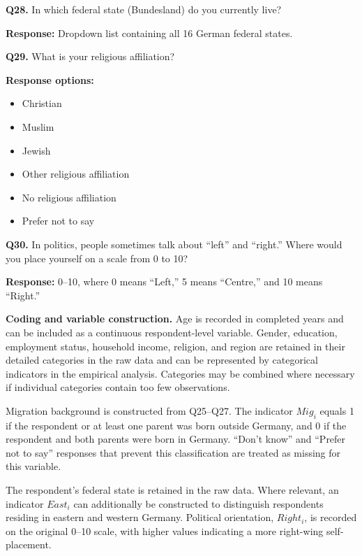 \medskip

\noindent\textbf{Q28.}
In which federal state (Bundesland) do you currently live?

\smallskip

\noindent
\textbf{Response:} Dropdown list containing all 16 German federal states.

\medskip

\noindent\textbf{Q29.}
What is your religious affiliation?

\smallskip

\noindent\textbf{Response options:}
\begin{itemize}
    \item Christian
    \item Muslim
    \item Jewish
    \item Other religious affiliation
    \item No religious affiliation
    \item Prefer not to say
\end{itemize}

\medskip

\noindent\textbf{Q30.}
In politics, people sometimes talk about ``left'' and ``right.'' Where would
you place yourself on a scale from 0 to 10?

\smallskip

\noindent
\textbf{Response:} 0--10, where 0 means ``Left,'' 5 means ``Centre,''
and 10 means ``Right.''

\medskip

\noindent\textbf{Coding and variable construction.} Age is recorded in completed years and can be included as a continuous
respondent-level variable. Gender, education, employment status, household
income, religion, and region are retained in their detailed categories in the
raw data and can be represented by categorical indicators in the empirical
analysis. Categories may be combined where necessary if individual categories
contain too few observations.

Migration background is constructed from Q25--Q27. The indicator
\(Mig_i\) equals 1 if the respondent or at least one parent was born outside
Germany, and 0 if the respondent and both parents were born in Germany.
``Don't know'' and ``Prefer not to say'' responses that prevent this
classification are treated as missing for this variable.

The respondent's federal state is retained in the raw data. Where relevant,
an indicator \(East_i\) can additionally be constructed to distinguish
respondents residing in eastern and western Germany. Political orientation,
\(Right_i\), is recorded on the original 0--10 scale, with higher values
indicating a more right-wing self-placement.
\medskip

